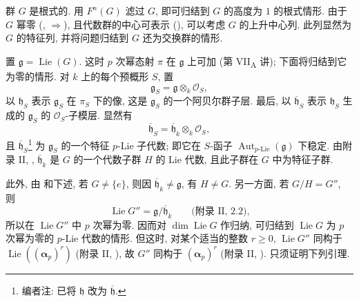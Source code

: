 
群 \(G\) 是根式的. 用 \(F^n(G)\) 滤过 \(G\), 即可归结到 \(G\) 的高度为 \(1\)
的根式情形. 由于 \(G\) 幂零
(,
\(\Rightarrow\)),
且代数群的中心可表示 (),
可以考虑 \(G\) 的上升中心列. 此列显然为 \(G\) 的特征列,
并将问题归结到 \(G\) 还为交换群的情形.

置 \(\mathfrak g=\operatorname{Lie}(G)\). 这时 \(p\) 次幂态射 \(\pi\)
在 \(\mathfrak g\) 上可加 (第 VII\textsubscript{A} 讲); 下面将归结到它为零的情形.
对 \(k\) 上的每个预概形 \(S\), 置
\[
  \mathfrak g_S=\mathfrak g\otimes_k\mathcal O_S,
\]
以 \(\mathfrak h_S\) 表示 \(\mathfrak g_S\) 在 \(\pi_S\) 下的像,
这是 \(\mathfrak g_S\) 的一个阿贝尔群子层.
最后, 以 \(\overline{\mathfrak h}_S\) 表示 \(\mathfrak h_S\)
生成的 \(\mathfrak g_S\) 的 \(\mathcal O_S\)-子模层. 显然有
\[
  \overline{\mathfrak h}_S
  =\overline{\mathfrak h}_k\otimes_k\mathcal O_S,
\]
且 \(\overline{\mathfrak h}_S\)\footnote[4]{编者注:
已将 \(\mathfrak h\) 改为 \(\overline{\mathfrak h}\).}
为 \(\mathfrak g_S\) 的一个特征 \(p\)-Lie 子代数;
即它在 \(S\)-函子 \(\operatorname{Aut}_{p\text{-}\mathrm{Lie}}(\mathfrak g)\) 下稳定.
由附录 II, ,
\(\overline{\mathfrak h}_k\) 是 \(G\) 的一个代数子群 \(H\) 的 Lie 代数, 且此子群在 \(G\) 中为特征子群.

此外, 由 和下述,
若 \(G\ne\{e\}\), 则因 \(\overline{\mathfrak h}_k\ne\mathfrak g\), 有 \(H\ne G\).
另一方面, 若 \(G/H=G''\), 则
\[
  \operatorname{Lie}G''
  =\mathfrak g/\overline{\mathfrak h}_k
  \qquad\text{(附录~II, 2.2),}
\]
所以在 \(\operatorname{Lie}G''\) 中 \(p\) 次幂为零.
因而对 \(\dim\operatorname{Lie}G\) 作归纳, 可归结到 \(\operatorname{Lie}G\)
为 \(p\) 次幂为零的 \(p\)-Lie 代数的情形.
但这时, 对某个适当的整数 \(r\geq0\), \(\operatorname{Lie}G''\)
同构于 \(\operatorname{Lie}((\boldsymbol\alpha_p)^r)\)
(附录 II, ),
故 \(G''\) 同构于 \((\boldsymbol\alpha_p)^r\)
(附录 II, ). 只须证明下列引理.

